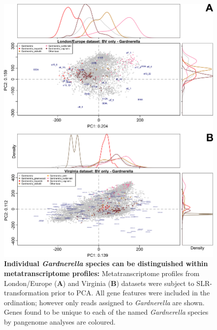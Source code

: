 \documentclass[sn-mathphys,Numbered]{sn-jnl}%
\begin{document}
\begin{figure}[H]
    \centering
    \includegraphics[scale = 0.9]{0_supplFig5_revised.png}
    \caption{\textbf{Individual \textit{Gardnerella} species can be distinguished within metatranscriptome profiles:} Metatranscriptome profiles from London/Europe (\textbf{A}) and Virginia (\textbf{B}) datasets were subject to SLR-transformation prior to PCA. All gene features were included in the ordination; however only reads assigned to \textit{Gardnerella} are shown. Genes found to be unique to each of the named \textit{Gardnerella} species by pangenome analyses are coloured.} \label{fig:sfigGVbiplots}
\end{figure}
\newpage
\end{document}
